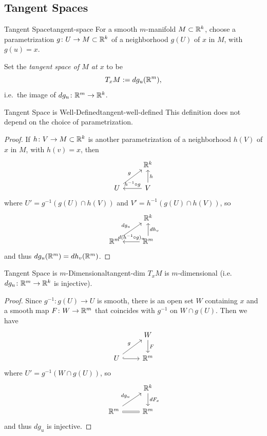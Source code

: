 \subsection{Tangent Spaces}

\begin{definition}{Tangent Space}{tangent-space}
    For a smooth $m$-manifold $M \subset \mathbb{R}^k$, choose a parametrization $g \colon U \to M \subset \mathbb{R}^k$ of a neighborhood $g(U)$ of $x$ in $M$, with $g(u) = x$.

    Set the \emph{tangent space of $M$ at $x$} to be
    \[
        T_x M := dg_u(\mathbb{R}^m),
    \]
    i.e.\ the image of $dg_u \colon \mathbb{R}^m \to \mathbb{R}^k$.
\end{definition}

\begin{proposition}{Tangent Space is Well-Defined}{tangent-well-defined}
    This definition does not depend on the choice of parametrization.
\end{proposition}

\begin{proof}
    If $h \colon V \to M \subset \mathbb{R}^k$ is another parametrization of a neighborhood $h(V)$ of $x$ in $M$, with $h(v) = x$, then
    \[
    \begin{tikzcd}
        & \R^k \\
        U \arrow[ur, "g"] & V \arrow[l, "h^{-1} \circ g"'] \arrow[u, "h"']
    \end{tikzcd}
    \]
    where $U' = g^{-1}(g(U) \cap h(V))$ and $V' = h^{-1}(g(U) \cap h(V))$, so
    \[
    \begin{tikzcd}
        & \R^k \\
        \R^m \arrow[ur, "dg_u"] & \R^m \arrow[l, "d(h^{-1} \circ g)_u"'] \arrow[u, "dh_v"']
    \end{tikzcd}
    \]
    and thus $dg_u(\mathbb{R}^m) = dh_v(\mathbb{R}^m)$.
\end{proof}

\begin{proposition}{Tangent Space is $m$-Dimensional}{tangent-dim}
    $T_x M$ is $m$-dimensional (i.e.\ $dg_u \colon \mathbb{R}^m \to \mathbb{R}^k$ is injective).
\end{proposition}

\begin{proof}
    Since $g^{-1} \colon g(U) \to U$ is smooth, there is an open set $W$ containing $x$ and a smooth map $F \colon W \to \mathbb{R}^m$ that coincides with $g^{-1}$ on $W \cap g(U)$. Then we have
    \[
    \begin{tikzcd}
        & W \arrow[d, "F"] \\
        U \arrow[r, hook] \arrow[ur, "g"] & \R^m
    \end{tikzcd}
    \]
    where $U' = g^{-1}(W \cap g(U))$, so
    \[
    \begin{tikzcd}
        & \R^k \arrow[d, "dF_x"] \\
        \R^m \arrow[ur, "dg_u"] \arrow[r, equal] & \R^m
    \end{tikzcd}
    \]
    and thus $dg_u$ is injective.
\end{proof}


